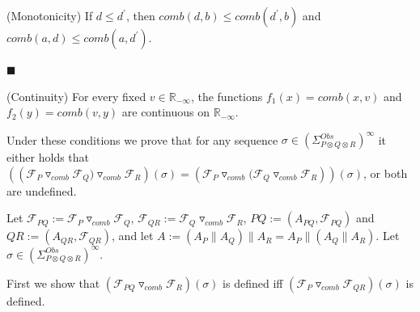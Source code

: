 (Monotonicity) If $d\leq d^{\prime}$, then $\mathit{comb}(d,b)\leq\mathit{comb}(d^{\prime},b)$ and $\mathit{comb}(a,d)\leq\mathit{comb}(a,d^{\prime})$.\par
 
 
 
\par\noindent  $\blacksquare$ 
 
(Continuity) For every fixed $v\in\mathbb{R}_{-\infty}$, the functions $f_{1}(x)=\mathit{comb}(x,v)$ and $f_{2}(y)=\mathit{comb}(v,y)$ are continuous on $\mathbb{R}_{-\infty}$.\par
 
 
  
 
 
Under these conditions we prove that for any sequence $\sigma\in(\Sigma_{P\otimes Q\otimes R}^{Obs})^{\infty}$ it either holds that $(({{{{\mathcal{F}_{P}}\mathbin{\triangledown_{\mathit{comb}}}{\mathcal{F}_{Q})}}}\mathbin{\triangledown_{\mathit{comb}}}{\mathcal{F}_{R}}})(\sigma)=({{\mathcal{F}_{P}}\mathbin{\triangledown_{\mathit{comb}}}{{{(\mathcal{F}_{Q}}\mathbin{\triangledown_{\mathit{comb}}}{\mathcal{F}_{R}}}}}))(\sigma)$, or both are undefined.\par
 
 
 
Let $\mathcal{F}_{PQ}:={{\mathcal{F}_{P}}\mathbin{\triangledown_{\mathit{comb}}}{\mathcal{F}_{Q}}}$, $\mathcal{F}_{QR}:={{\mathcal{F}_{Q}}\mathbin{\triangledown_{\mathit{comb}}}{\mathcal{F}_{R}}}$, $PQ:=(A_{PQ},\mathcal{F}_{PQ})$ and $QR:=(A_{QR},\mathcal{F}_{QR})$, and let $A:=(A_{P}\parallel A_{Q})\parallel A_{R}=A_{P}\parallel(A_{Q}\parallel A_{R})$. Let $\sigma\in(\Sigma_{P\otimes Q\otimes R}^{Obs})^{\infty}$.\par
 
 
 
First we show that $({{\mathcal{F}_{PQ}}\mathbin{\triangledown_{\mathit{comb}}}{\mathcal{F}_{R}}})(\sigma)$ is defined iff $({{\mathcal{F}_{P}}\mathbin{\triangledown_{\mathit{comb}}}{\mathcal{F}_{QR}}})(\sigma)$ is defined.\par
 
 

